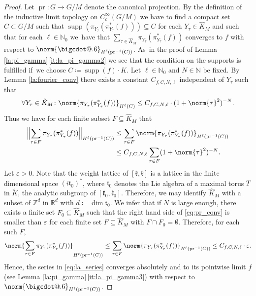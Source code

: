 \documentclass[JEP,XML,SOM,NoFloatCountersInSection,Unicode,published]{cedram}
\makeatletter
\newcommand{\Bnorm}[1]{\Bigl\|#1\Bigr\|}
\theoremstyle{definition}
\DeclarePairedDelimiter{\norm}\lVert\rVert
\newcommand{\sn}[3]{\ensuremath{\norm{#3}_{H^{#1}(#2)}}}
\newcommand*\bigcdot{\mathpalette\bigcdot@{.6}}%
\newcommand*\bigcdot@[2]{\mathbin{\vcenter{\hbox{\scalebox{#2}{$\m@th#1\bullet$}}}}}
\newcommand{\mf}[1]{\ensuremath{\mathfrak{#1}}}
\newcommand{\on}[1]{\ensuremath{\operatorname{#1}}}
\newcommand{\R}{\ensuremath{\mathbb{R}}}
\newcommand{\N}{\ensuremath{\mathbb{N}}}
\newcommand{\Z}{\ensuremath{\mathbb{Z}}}
\makeatother
\begin{document}
\begin{proof}
Let $\on{pr}\colon G\to G/M$ denote the canonical projection. By the definition of the inductive limit topology on $C_c^\infty(G/M)$ we have to find a compact set $C\subset G/M$ such that $\on{supp}(\pi_{Y_\tau}(\pi_{Y_\tau}^*(f)))\subseteq C$ for each $Y_\tau\in\hat K_M$ and such that for each $\ell\in\N_0$ we~have that $\sum_{\tau\in\hat K_M}\pi_{Y_\tau}(\pi_{Y_\tau}^*(f))$ converges to $f$ with respect to $\norm{\bigcdot}_{H^\ell(\on{pr}^{-1}(C))}$. As~in the proof of Lemma \ref{la:pi_gamma}\,\eqref{it:la_pi_gamma2} we see that the condition on the supports is fulfilled if~we choose $C\coloneqq\on{supp}(f)\cdot K$. Let $\ell\in\N_0$ and $N\in\N$ be fixed. By Lemma \ref{la:fourier_conv} there exists a constant $C_{f,C,N,\ell}$ independent of $Y_\tau$ such that
\[
\forall Y_\tau\in\hat K_M\colon\sn{\ell}{C}{\pi_{Y_\tau}(\pi_{Y_\tau}^*(f))}\leq C_{f,C,N,\ell}\cdot (1+\norm{\tau}^2)^{-N}.
\]
Thus we have for each finite subset $F\subseteq\hat K_M$ that
\begin{equation}\label{eq:pr_conv}
\begin{aligned}
\Bnorm{\sum_{\tau\in F}\pi_{Y_\tau}(\pi_{Y_\tau}^*(f))}_{H^\ell(\on{pr}^{-1}(C))}&\leq\sum_{\tau\in F}\norm{\pi_{Y_\tau}(\pi_{Y_\tau}^*(f))}_{H^\ell(\on{pr}^{-1}(C))}\\
&\leq C_{f,C,N,\ell}\sum_{\tau\in F}(1+\norm{\tau}^2)^{-N}.
\end{aligned}
\end{equation}
Let $\varepsilon>0$. Note that the weight lattice of $[\mf k,\mf k]$ is a lattice in the finite dimensional space $(i\mf t_0)^*$, where $\mf t_0$ denotes the Lie algebra of a maximal torus $T$ in $\tilde K$, the analytic subgroup of $[\mf k_0,\mf k_0]$. Therefore, we may identify $\hat K_M$ with a subset of $\Z^d$ in $\R^d$ with $d\coloneqq\dim\mf t_0$. We infer that if $N$ is large enough, there exists a finite set $F_0\subseteq\hat K_M$ such that the right hand side of \eqref{eq:pr_conv} is smaller than $\varepsilon$ for each finite set $F\subseteq\hat K_M$ with $F\cap F_0=\emptyset$. Therefore, for each such $F$,
\[
\norm{\sum_{\tau\in F}\pi_{Y_\tau}(\pi_{Y_\tau}^*(f))}_{H^\ell(\on{pr}^{-1}(C))}\leq\sum_{\tau\in F}\norm{\pi_{Y_\tau}(\pi_{Y_\tau}^*(f))}_{H^\ell(\on{pr}^{-1}(C))}\leq C_{f,C,N,\ell}\cdot\varepsilon.
\]
Hence, the series in \eqref{eq:la_series} converges absolutely and to its pointwise limit $f$ (see Lemma \ref{la:pi_gamma}\,\eqref{it:la_pi_gamma3}) with respect to $\norm{\bigcdot}_{H^\ell(\on{pr}^{-1}(C))}$.
\end{proof}
\end{document}
